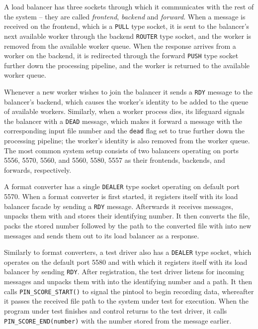 A load balancer has three \zmq sockets through which it communicates with the rest of the system -- they are
called \emph{frontend}, \emph{backend} and \emph{forward}. When a message is received on the frontend,
which is a \texttt{PULL} type socket, it is sent to the balancer's next available worker through
the backend \texttt{ROUTER} type socket, and the worker is removed from the available worker queue. When the
response arrives from a worker on the backend, it is redirected through the forward \texttt{PUSH} type socket
further down the processing pipeline, and the worker is returned to the available worker queue. 

Whenever a new worker wishes to join the balancer it sends a \texttt{RDY} message to the balancer's backend,
which causes the worker's identity to be added to the queue of available workers. Similarly, when a worker
process dies, its lifeguard signals the balancer with a \texttt{DEAD} message, which makes it forward a
message with the corresponding input file number and the \texttt{dead} flag set to true further down the
processing pipeline; the worker's identity is also removed from the worker queue. The most common system setup
consists of two balancers operating on ports 5556, 5570, 5560, and 5560, 5580, 5557 as their frontends,
backends, and forwards, respectively.

A format converter has a single \texttt{DEALER} type socket operating on default port 5570.
When a format converter is first started, it registers itself with its load balancer facade by sending a
\texttt{RDY} message. Afterwards it receives \zmq messages, unpacks them with \msgpack and stores their
identifying number. It then converts the file, packs the stored number followed by the path to the converted
file with \msgpack into new \zmq messages and sends them out to its load balancer as a response.

Similarly to format converters, a test driver also has a \texttt{DEALER} type socket, which operates on the
default port 5580 and with which it registers itself with its load balancer by sending \texttt{RDY}. After
registration, the test driver listens for incoming \zmq messages and unpacks them with \msgpack
into the identifying number and a path. It then calls \texttt{PIN\_SCORE\_START()} to signal the pintool to
begin recording data, whereafter it passes the received file path to the system under test for execution. When
the program under test finishes and control returns to the test driver, it calls
\texttt{PIN\_SCORE\_END(number)} with the number stored from the message earlier.

